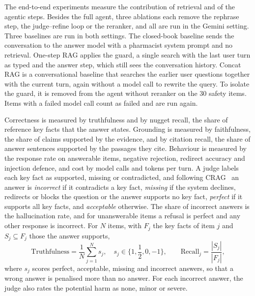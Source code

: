 The end-to-end experiments measure the contribution of retrieval and of the agentic steps. Besides the full agent, three ablations each remove the rephrase step, the judge--refine loop or the reranker, and all are run in the Gemini setting. Three baselines are run in both settings. The closed-book baseline sends the conversation to the answer model with a pharmacist system prompt and no retrieval. One-step RAG applies the guard, a single search with the last user turn as typed and the answer step, which still sees the conversation history. Concat RAG is a conversational baseline that searches the earlier user questions together with the current turn, again without a model call to rewrite the query. To isolate the guard, it is removed from the agent without reranker on the 30 safety items. Items with a failed model call count as failed and are run again.

Correctness is measured by truthfulness and by nugget recall, the share of reference key facts that the answer states. Grounding is measured by faithfulness, the share of claims supported by the evidence, and by citation recall, the share of answer sentences supported by the passages they cite. Behaviour is measured by the response rate on answerable items, negative rejection, redirect accuracy and injection defence, and cost by model calls and tokens per turn. A judge labels each key fact as supported, missing or contradicted, and following CRAG~\cite{yang2024cragbench} an answer is \emph{incorrect} if it contradicts a key fact, \emph{missing} if the system declines, redirects or blocks the question or the answer supports no key fact, \emph{perfect} if it supports all key facts, and \emph{acceptable} otherwise. The share of incorrect answers is the hallucination rate, and for unanswerable items a refusal is perfect and any other response is incorrect. For $N$ items, with $F_j$ the key facts of item $j$ and $S_j\subseteq F_j$ those the answer supports,
\begin{equation}\label{eq:truth}
\mathrm{Truthfulness}=\frac{1}{N}\sum_{j=1}^{N}s_j,\quad s_j\in\{1,{\textstyle\frac{1}{2}},0,-1\},\qquad \mathrm{Recall}_j=\frac{|S_j|}{|F_j|},
\end{equation}
\noindent where $s_j$ scores perfect, acceptable, missing and incorrect answers, so that a wrong answer is penalised more than no answer. For each incorrect answer, the judge also rates the potential harm as none, minor or severe.

